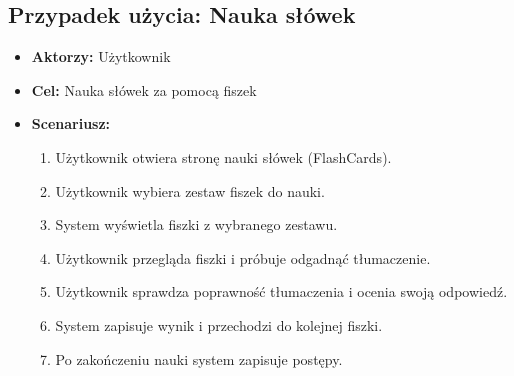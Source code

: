 \subsection{Przypadek użycia: Nauka słówek}
\begin{itemize}
    \item \textbf{Aktorzy:} Użytkownik
    \item \textbf{Cel:} Nauka słówek za pomocą fiszek
    \item \textbf{Scenariusz:}
          \begin{enumerate}
              \item Użytkownik otwiera stronę nauki słówek (FlashCards).
              \item Użytkownik wybiera zestaw fiszek do nauki.
              \item System wyświetla fiszki z wybranego zestawu.
              \item Użytkownik przegląda fiszki i próbuje odgadnąć tłumaczenie.
              \item Użytkownik sprawdza poprawność tłumaczenia i ocenia swoją odpowiedź.
              \item System zapisuje wynik i przechodzi do kolejnej fiszki.
              \item Po zakończeniu nauki system zapisuje postępy.
          \end{enumerate}
\end{itemize}


